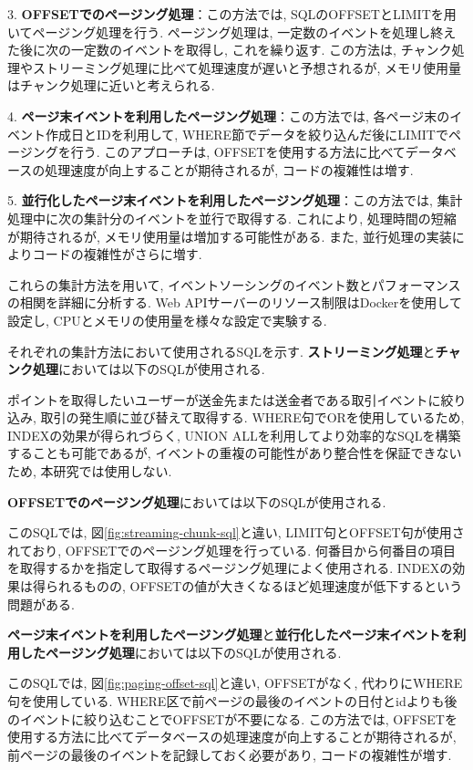 \documentclass[../../../main]{subfiles}
\begin{document}
    3. \textbf{OFFSETでのページング処理}：この方法では, SQLのOFFSETとLIMITを用いてページング処理を行う. ページング処理は, 一定数のイベントを処理し終えた後に次の一定数のイベントを取得し, これを繰り返す. この方法は, チャンク処理やストリーミング処理に比べて処理速度が遅いと予想されるが, メモリ使用量はチャンク処理に近いと考えられる.

    4. \textbf{ページ末イベントを利用したページング処理}：この方法では, 各ページ末のイベント作成日とIDを利用して, WHERE節でデータを絞り込んだ後にLIMITでページングを行う. このアプローチは, OFFSETを使用する方法に比べてデータベースの処理速度が向上することが期待されるが, コードの複雑性は増す.

    5. \textbf{並行化したページ末イベントを利用したページング処理}：この方法では, 集計処理中に次の集計分のイベントを並行で取得する. これにより, 処理時間の短縮が期待されるが, メモリ使用量は増加する可能性がある. また, 並行処理の実装によりコードの複雑性がさらに増す.

    これらの集計方法を用いて, イベントソーシングのイベント数とパフォーマンスの相関を詳細に分析する. Web APIサーバーのリソース制限はDockerを使用して設定し, CPUとメモリの使用量を様々な設定で実験する.

    それぞれの集計方法において使用されるSQLを示す. \textbf{ストリーミング処理}と\textbf{チャンク処理}においては以下のSQLが使用される.

    

    ポイントを取得したいユーザーが送金先または送金者である取引イベントに絞り込み, 取引の発生順に並び替えて取得する. WHERE句でORを使用しているため, INDEXの効果が得られづらく, UNION ALLを利用してより効率的なSQLを構築することも可能であるが, イベントの重複の可能性があり整合性を保証できないため, 本研究では使用しない.

    \textbf{OFFSETでのページング処理}においては以下のSQLが使用される.

    

    このSQLでは, 図\ref{fig:streaming-chunk-sql}と違い, LIMIT句とOFFSET句が使用されており, OFFSETでのページング処理を行っている. 何番目から何番目の項目を取得するかを指定して取得するページング処理によく使用される. INDEXの効果は得られるものの, OFFSETの値が大きくなるほど処理速度が低下するという問題がある.

    \textbf{ページ末イベントを利用したページング処理}と\textbf{並行化したページ末イベントを利用したページング処理}においては以下のSQLが使用される.

    

    このSQLでは, 図\ref{fig:paging-offset-sql}と違い, OFFSETがなく, 代わりにWHERE句を使用している. WHERE区で前ページの最後のイベントの日付とidよりも後のイベントに絞り込むことでOFFSETが不要になる. この方法では, OFFSETを使用する方法に比べてデータベースの処理速度が向上することが期待されるが, 前ページの最後のイベントを記録しておく必要があり, コードの複雑性が増す.
\end{document}

